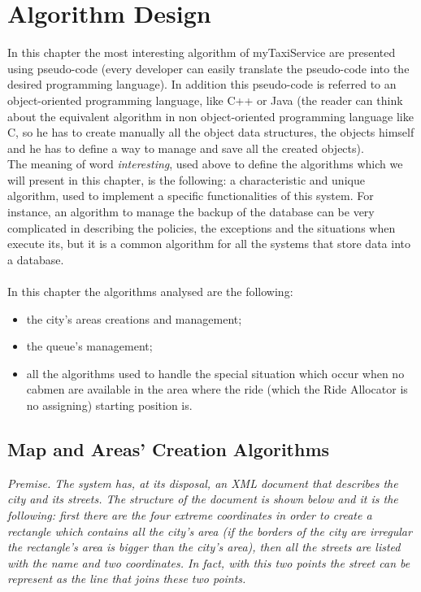 \documentclass[\mainpath/main]{subfiles}
\begin{document}
\chapter{Algorithm Design}
\label{algorithm_design}

\setmyfancystyle

In this chapter the most interesting algorithm of myTaxiService are presented using pseudo-code (every developer can easily translate the pseudo-code into the desired programming language). In addition this pseudo-code is referred to an object-oriented programming language, like C++ or Java (the reader can think about the equivalent algorithm in non object-oriented programming language like C, so he has to create manually all the object data structures, the objects himself and he has to define a way to manage and save all the created objects).\\
The meaning of word \textit{interesting}, used above to define the algorithms which we will present in this chapter, is the following: a characteristic and unique algorithm, used to implement a specific functionalities of this system. For instance, an algorithm to manage the backup of the database can be very complicated in describing the policies, the exceptions and the situations when execute its, but it is a common algorithm for all the systems that store data into a database.\\
\\
In this chapter the algorithms analysed are the following:
\begin{itemize}
	\item the city's areas creations and management;
	\item the queue's management;
	\item all the algorithms used to handle the special situation which occur when no cabmen are available in the area where the ride (which the Ride Allocator is no assigning) starting position is.\\
\end{itemize}

\section{Map and Areas' Creation Algorithms}
\label{AlgorithmDesign:MapAreaAlgorithms}

\textit{Premise. The system has, at its disposal, an XML document that describes the city and its streets. The structure of the document is shown below and it is the following: first there are the four extreme coordinates in order to create a rectangle which contains all the city's area (if the borders of the city are irregular the rectangle's area is bigger than the city's area), then all the streets are listed with the name and two coordinates. In fact, with this two points the street can be represent as the line that joins these two points.}
\end{document}
